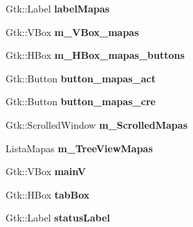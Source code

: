 \begin{DoxyCompactItemize}
\item 
\hypertarget{classMainWindow_ae037e61673e84e41a6f28975dd730fd4}{Gtk\-::\-Label {\bfseries label\-Mapas}}\label{classMainWindow_ae037e61673e84e41a6f28975dd730fd4}

\item 
\hypertarget{classMainWindow_a60812cc8e7aa530e73ea1f6515eb7acb}{Gtk\-::\-V\-Box {\bfseries m\-\_\-\-V\-Box\-\_\-mapas}}\label{classMainWindow_a60812cc8e7aa530e73ea1f6515eb7acb}

\item 
\hypertarget{classMainWindow_ab04dad89a39bd6a05ab9b360ca301544}{Gtk\-::\-H\-Box {\bfseries m\-\_\-\-H\-Box\-\_\-mapas\-\_\-buttons}}\label{classMainWindow_ab04dad89a39bd6a05ab9b360ca301544}

\item 
\hypertarget{classMainWindow_ab2355dd68ee5c74d391062fa873ad826}{Gtk\-::\-Button {\bfseries button\-\_\-mapas\-\_\-act}}\label{classMainWindow_ab2355dd68ee5c74d391062fa873ad826}

\item 
\hypertarget{classMainWindow_afc9a680bd1aa98e092db560b592c4467}{Gtk\-::\-Button {\bfseries button\-\_\-mapas\-\_\-cre}}\label{classMainWindow_afc9a680bd1aa98e092db560b592c4467}

\item 
\hypertarget{classMainWindow_a8048011e7fd4242ec20a1a5756ad5bf3}{Gtk\-::\-Scrolled\-Window {\bfseries m\-\_\-\-Scrolled\-Mapas}}\label{classMainWindow_a8048011e7fd4242ec20a1a5756ad5bf3}

\item 
\hypertarget{classMainWindow_a978da20f46529029b3ff46b246fcee09}{Lista\-Mapas {\bfseries m\-\_\-\-Tree\-View\-Mapas}}\label{classMainWindow_a978da20f46529029b3ff46b246fcee09}

\item 
\hypertarget{classMainWindow_a6f9f64b3e9d8baef03dc65513cb68530}{Gtk\-::\-V\-Box {\bfseries main\-V}}\label{classMainWindow_a6f9f64b3e9d8baef03dc65513cb68530}

\item 
\hypertarget{classMainWindow_a7d222c50fa848d67546c7f212875f4c1}{Gtk\-::\-H\-Box {\bfseries tab\-Box}}\label{classMainWindow_a7d222c50fa848d67546c7f212875f4c1}

\item 
\hypertarget{classMainWindow_abe645ed1d8d45e5ba978f324c29d7e09}{Gtk\-::\-Label {\bfseries status\-Label}}\label{classMainWindow_abe645ed1d8d45e5ba978f324c29d7e09}

\end{DoxyCompactItemize}
